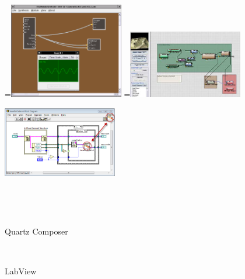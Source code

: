 \documentclass{article}
\begin{document}
\begin{figure}[ht]
  
  =\hbox{\includegraphics[width=5cm]{alsa-modular-synth}}%
  =\hbox{\includegraphics[width=5cm]{world-machine}}%
  {\,}
  \hfill 
  \begin{minipage}{5cm}
    \centering
  \end{minipage}
  \hfill
  \begin{minipage}{5cm}
    \centering
    \includegraphics[width=5cm]{labview}
  \end{minipage}
  \hfill
  {\,}
  
  
  {\,}
  \hfill 
  \begin{minipage}{5cm}
    \centering
    \caption{Quartz Composer\cite{quartz-composer}}
    \label{fig:quartz-composer}
  \end{minipage}
  \hfill
  \begin{minipage}{5cm}
    \centering
    \caption{LabView\cite{labview}}
  \end{minipage}
  \hfill
  {\,}
  

\end{figure}
\end{document}
